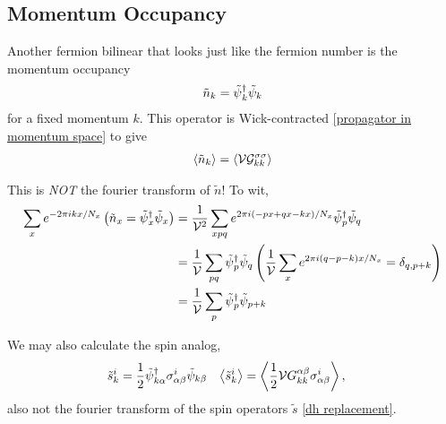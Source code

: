 \subsection{Momentum Occupancy}

Another fermion bilinear that looks just like the fermion number is the momentum occupancy
\begin{align}
	\tilde{n}_{k} = \tilde{\psi}{}^{\dagger}_k \tilde{\psi}_k
\end{align}
for a fixed momentum $k$.
This operator is Wick-contracted \eqref{propagator in momentum space} to give
\begin{align}
	\left\langle \tilde{n}_k \right\rangle = \left\langle  \mathcal{V} \mathcal{G}^{\sigma\sigma}_{kk} \right\rangle
\end{align}

This is \emph{NOT} the fourier transform of $\tilde{n}$!
To wit,
\begin{align}
	\sum_x e^{-2\pi i kx/N_x} \left(\tilde{n}_x = \tilde{\psi}{}^{\dagger}_x \tilde{\psi}_x\right)
	&=
	\frac{1}{\mathcal{V}^2}\sum_{xpq} e^{2\pi i (-px + qx - kx)/N_x} \tilde{\psi}{}^{\dagger}_p \tilde{\psi}_q
	\nonumber\\
	&=
	\frac{1}{\mathcal{V}}\sum_{pq} \tilde{\psi}{}^{\dagger}_p \tilde{\psi}_q \left(\frac{1}{\mathcal{V}} \sum_x e^{2\pi i (q -p - k)x/N_x} = \delta_{q,p+k}\right)
	\nonumber\\
	&=
	\frac{1}{\mathcal{V}}\sum_{p} \tilde{\psi}{}^{\dagger}_p \tilde{\psi}_{p+k}
\end{align}

We may also calculate the spin analog,
\begin{align}
	\tilde{s}^i_{k} &= \frac{1}{2} \tilde{\psi}{}^{\dagger}_{k\alpha} \sigma^i_{\alpha\beta} \tilde{\psi}_{k\beta}
	&
	\left\langle \tilde{s}^i_k \right\rangle &= \left\langle  \frac{1}{2} \mathcal{V} G^{\alpha\beta}_{kk} \sigma^i_{\alpha\beta} \right\rangle,
\end{align}
also not the fourier transform of the spin operators $\tilde{s}$ \eqref{dh replacement}.
